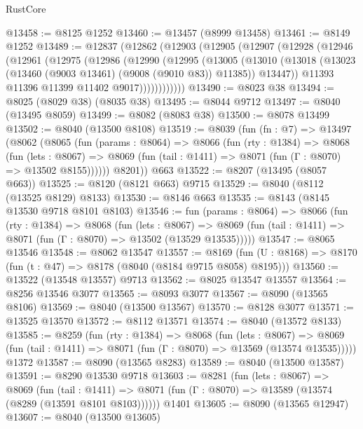 \begin{lexlean}{RustCore}
\begin{coremodule}
@13458 := @8125 @1252
@13460 := @13457 (@8999 @13458)
@13461 := @8149 @1252
@13489 := @12837
    (@12862
      (@12903
        (@12905
          (@12907
            (@12928
              (@12946
                (@12961
                  (@12975
                    (@12986
                      (@12990
                        (@12995
                          (@13005
                            (@13010
                              (@13018
                                (@13023 (@13460 (@9003 @13461) (@9008 (@9010 @83)) @11385))
                                @13447))
                            @11393
                            @11396
                            @11399
                            @11402
                            @9017))))))))))))
@13490 := @8023 @38
@13494 := @8025 (@8029 @38) (@8035 @38)
@13495 := @8044 @9712
@13497 := @8040 (@13495 @8059)
@13499 := @8082 (@8083 @38)
@13500 := @8078 @13499
@13502 := @8040 (@13500 @8108)
@13519 := @8039
    (fun (fn : @7) =>
    @13497
      (@8062
        (@8065
          (fun (params : @8064) =>
          @8066
            (fun (rty : @1384) =>
            @8068
              (fun (lets : @8067) =>
              @8069 (fun (tail : @1411) => @8071 (fun (Γ : @8070) => @13502 @8155))))))
        @8201))
    @663
@13522 := @8207 (@13495 (@8057 @663))
@13525 := @8120 (@8121 @663) @9715
@13529 := @8040 (@8112 (@13525 @8129) @8133)
@13530 := @8146 @663
@13535 := @8143 (@8145 @13530 @9718 @8101 @8103)
@13546 := fun (params : @8064) =>
  @8066
    (fun (rty : @1384) =>
    @8068
      (fun (lets : @8067) =>
      @8069 (fun (tail : @1411) => @8071 (fun (Γ : @8070) => @13502 (@13529 @13535)))))
@13547 := @8065 @13546
@13548 := @8062 @13547
@13557 := @8169
    (fun (U : @8168) => @8170 (fun (t : @47) => @8178 (@8040 (@8184 @9715 @8058) @8195)))
@13560 := @13522 (@13548 @13557) @9713
@13562 := @8025 @13547 @13557
@13564 := @8256 @13546 @3077
@13565 := @8093 @3077
@13567 := @8090 (@13565 @8106)
@13569 := @8040 (@13500 @13567)
@13570 := @8128 @3077
@13571 := @13525 @13570
@13572 := @8112 @13571
@13574 := @8040 (@13572 @8133)
@13585 := @8259
    (fun (rty : @1384) =>
    @8068
      (fun (lets : @8067) =>
      @8069 (fun (tail : @1411) => @8071 (fun (Γ : @8070) => @13569 (@13574 @13535)))))
    @1372
@13587 := @8090 (@13565 @8283)
@13589 := @8040 (@13500 @13587)
@13591 := @8290 @13530 @9718
@13603 := @8281
    (fun (lets : @8067) =>
    @8069
      (fun (tail : @1411) =>
      @8071 (fun (Γ : @8070) => @13589 (@13574 (@8289 (@13591 @8101 @8103))))))
    @1401
@13605 := @8090 (@13565 @12947)
@13607 := @8040 (@13500 @13605)

\end{coremodule}
\end{lexlean}
